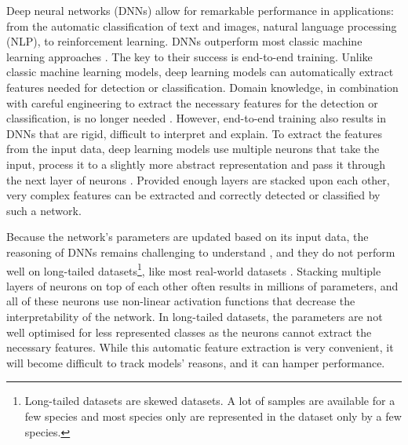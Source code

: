 \documentclass[a4paper, 12pt, oneside]{book} %
\begin{document}
Deep neural networks (DNNs) allow for remarkable performance in applications: from the automatic classification of text and images, natural language processing (NLP), to reinforcement learning.
DNNs outperform most classic machine learning approaches \autocite{he_delving_2015, brown_language_2020}.
The key to their success is end-to-end training.
Unlike classic machine learning models, deep learning models can automatically extract features needed for detection or classification.
Domain knowledge, in combination with careful engineering to extract the necessary features for the detection or classification, is no longer needed \autocite{lecun_deep_2015}.
However, end-to-end training also results in DNNs that are rigid, difficult to interpret and explain.
To extract the features from the input data, deep learning models use multiple neurons that take the input, process it to a slightly more abstract representation and pass it through the next layer of neurons \autocite{schmidhuber_deep_2015}.
Provided enough layers are stacked upon each other, very complex features can be extracted and correctly detected or classified by such a network.

Because the network's parameters are updated based on its input data, the reasoning of DNNs remains challenging to understand \autocite{li_interpretable_2021, losch_interpretability_2019}, and they do not perform well on long-tailed datasets\footnote{Long-tailed datasets are skewed datasets. A lot of samples are available for a few species and most species only are represented in the dataset only by a few species.}, like most real-world datasets \autocite{van_horn_inaturalist_2018}.
Stacking multiple layers of neurons on top of each other often results in millions of parameters, and all of these neurons use non-linear activation functions that decrease the interpretability of the network.
In long-tailed datasets, the parameters are not well optimised for less represented classes as the neurons cannot extract the necessary features.
While this automatic feature extraction is very convenient, it will become difficult to track models' reasons, and it can hamper performance.
\end{document}
